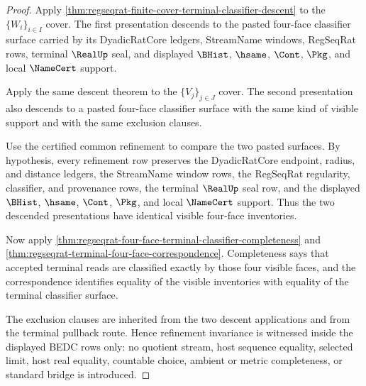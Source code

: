 \begin{proof}
Apply
\autoref{thm:regseqrat-finite-cover-terminal-classifier-descent} to the
$\{W_i\}_{i \in I}$ cover. The first presentation descends to the pasted
four-face classifier surface carried by its DyadicRatCore ledgers,
StreamName windows, RegSeqRat rows, terminal $\RealUp$ seal, and displayed
$\BHist$, $\hsame$, $\Cont$, $\Pkg$, and local $\NameCert$ support.

Apply the same descent theorem to the $\{V_j\}_{j \in J}$ cover. The second
presentation also descends to a pasted four-face classifier surface with the
same kind of visible support and with the same exclusion clauses.

Use the certified common refinement to compare the two pasted surfaces. By
hypothesis, every refinement row preserves the DyadicRatCore endpoint, radius,
and distance ledgers, the StreamName window rows, the RegSeqRat regularity,
classifier, and provenance rows, the terminal $\RealUp$ seal row, and the
displayed $\BHist$, $\hsame$, $\Cont$, $\Pkg$, and local $\NameCert$ support.
Thus the two descended presentations have identical visible four-face
inventories.

Now apply
\autoref{thm:regseqrat-four-face-terminal-classifier-completeness} and
\autoref{thm:regseqrat-terminal-four-face-correspondence}. Completeness says
that accepted terminal reads are classified exactly by those four visible
faces, and the correspondence identifies equality of the visible inventories
with equality of the terminal classifier surface.

The exclusion clauses are inherited from the two descent applications and
from the terminal pullback route. Hence refinement invariance is witnessed
inside the displayed BEDC rows only: no quotient stream, host sequence
equality, selected limit, host real equality, countable choice, ambient or
metric completeness, or standard bridge is introduced.
\end{proof}
